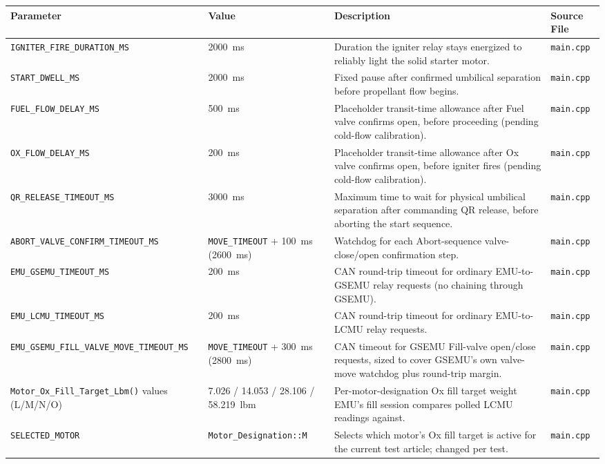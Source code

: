 ﻿\documentclass[11pt,letterpaper]{article}
\begin{document}
\begingroup
\footnotesize
\begin{longtable}{@{}p{3.2cm}p{2.4cm}p{6.2cm}p{2.6cm}@{}}
\toprule
Parameter & Value & Description & Source File \\
\midrule
\texttt{IGNITER\_\allowbreak FIRE\_\allowbreak DURATION\_\allowbreak MS} & 2000~ms & Duration the igniter relay stays energized to reliably light the solid starter motor. & \texttt{main.cpp} \\
\texttt{START\_\allowbreak DWELL\_\allowbreak MS} & 2000~ms & Fixed pause after confirmed umbilical separation before propellant flow begins. & \texttt{main.cpp} \\
\texttt{FUEL\_\allowbreak FLOW\_\allowbreak DELAY\_\allowbreak MS} & 500~ms & Placeholder transit-time allowance after Fuel valve confirms open, before proceeding (pending cold-flow calibration). & \texttt{main.cpp} \\
\texttt{OX\_\allowbreak FLOW\_\allowbreak DELAY\_\allowbreak MS} & 200~ms & Placeholder transit-time allowance after Ox valve confirms open, before igniter fires (pending cold-flow calibration). & \texttt{main.cpp} \\
\texttt{QR\_\allowbreak RELEASE\_\allowbreak TIMEOUT\_\allowbreak MS} & 3000~ms & Maximum time to wait for physical umbilical separation after commanding QR release, before aborting the start sequence. & \texttt{main.cpp} \\
\texttt{ABORT\_\allowbreak VALVE\_\allowbreak CONFIRM\_\allowbreak TIMEOUT\_\allowbreak MS} & \texttt{MOVE\_\allowbreak TIMEOUT} + 100~ms (2600~ms) & Watchdog for each Abort-sequence valve-close/open confirmation step. & \texttt{main.cpp} \\
\texttt{EMU\_\allowbreak GSEMU\_\allowbreak TIMEOUT\_\allowbreak MS} & 200~ms & CAN round-trip timeout for ordinary EMU-to-GSEMU relay requests (no chaining through GSEMU). & \texttt{main.cpp} \\
\texttt{EMU\_\allowbreak LCMU\_\allowbreak TIMEOUT\_\allowbreak MS} & 200~ms & CAN round-trip timeout for ordinary EMU-to-LCMU relay requests. & \texttt{main.cpp} \\
\texttt{EMU\_\allowbreak GSEMU\_\allowbreak FILL\_\allowbreak VALVE\_\allowbreak MOVE\_\allowbreak TIMEOUT\_\allowbreak MS} & \texttt{MOVE\_\allowbreak TIMEOUT} + 300~ms (2800~ms) & CAN timeout for GSEMU Fill-valve open/close requests, sized to cover GSEMU's own valve-move watchdog plus round-trip margin. & \texttt{main.cpp} \\
\texttt{Motor\_\allowbreak Ox\_\allowbreak Fill\_\allowbreak Target\_\allowbreak Lbm()} values (L/M/N/O) & 7.026 / 14.053 / 28.106 / 58.219~lbm & Per-motor-designation Ox fill target weight EMU's fill session compares polled LCMU readings against. & \texttt{main.cpp} \\
\texttt{SELECTED\_\allowbreak MOTOR} & \texttt{Motor\_\allowbreak Designation::M} & Selects which motor's Ox fill target is active for the current test article; changed per test. & \texttt{main.cpp} \\
\end{longtable}
\endgroup
\end{document}
